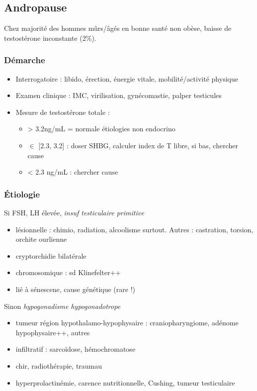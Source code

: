 \documentclass[11pt]{article}
\begin{document}
\subsection{Andropause}
\label{sec:org56f150f}
Chez majorité des hommes mûrs/âgés en bonne santé non obèse, baisse de
testostérone inconstante (2\%).

\subsubsection{Démarche}
\label{sec:org8b6a2a4}
\begin{itemize}
\item Interrogatoire : libido, érection, énergie vitale, mobilité/activité physique
\item Examen clinique : IMC, virilisation, gynécomastie, palper testicules
\item Mesure de testostérone totale :
\begin{itemize}
\item > 3.2ng/mL = normale \thus étiologies non endocrino
\item \(\in\) [2.3, 3.2] : doser SHBG, calculer index de T libre, si bas, chercher cause
\item < 2.3 ng/mL : chercher cause
\end{itemize}
\end{itemize}
\subsubsection{Étiologie}
\label{sec:orgbe07771}
Si FSH, LH élevée, \emph{insuf testiculaire primitive} 
\begin{itemize}
\item lésionnelle : chimio, radiation, alcoolisme surtout. Autres : castration,
torsion, orchite ourlienne
\item cryptorchidie bilatérale
\item chromosomique : sd Klinefelter++
\item lié à sénescene, cause génétique (rare !)
\end{itemize}
Sinon \emph{hypogonadisme hypogonadotrope}
\begin{itemize}
\item tumeur région hypothalamo-hypophysaire : craniopharyngiome, adénome
hypophysaire++, autres
\item infiltratif : sarcoïdose, hémochromatose
\item chir, radiothérapie, traumau
\item hyperprolactinémie, carence nutritionnelle, Cushing, tumeur testiculaire
\end{itemize}
\end{document}
